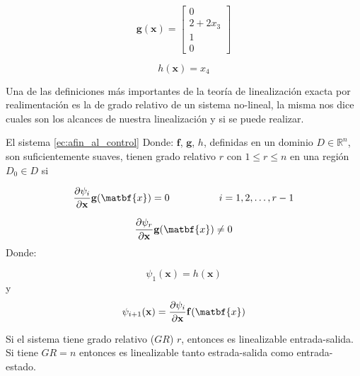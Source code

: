 \documentclass[10pt]{article}
\begin{document}
\begin{equation}
    \mathbf{g(\mathbf{x})}=
\begin{bmatrix}
 0\\
 2+ 2x_{3} \\
 1\\
 0
\end{bmatrix}
\label{ec:g}
\end{equation}

\begin{equation}
    h(\mathbf{x}) = x_{4}
\end{equation}

Una de las definiciones más importantes de la teoría de linealización exacta por
realimentación es la de grado relativo de un sistema no-lineal, la misma nos dice
cuales son los alcances de nuestra linealización y si se puede realizar.

\begin{defi}
    El sistema \eqref{ec:afin_al_control} Donde: $\mathbf{f}$, $\mathbf{g}$, $h$, definidas
    en un dominio $D\in \mathbb{R}^{n}$, son suficientemente suaves, tienen grado relativo $r$
    con $1\leq r \leq n$ en una región $D_{0}\in D$ si

\begin{equation}
    \frac{\partial \psi_{i}}{\partial \mathbf{x}}\mathbf{g}(\matbf{x}) = 0 \hspace{5em} i=1,2,\dots , r-1
\end{equation}

\begin{equation}
    \frac{\partial \psi_{r}}{\partial \mathbf{x}} \mathbf{g}(\matbf{x}) \neq 0  
\end{equation}
       Donde:

\begin{equation}
    \psi_{1}(\mathbf{x}) = h(\mathbf{x}) 
\end{equation}
y
\begin{equation}
     \psi_{i+1}(\mathbf{x}) = \frac{\partial \psi_{i}}{\partial \mathbf{x}}\mathbf{f}(\matbf{x}) 
\end{equation}

\end{defi}   


Si el sistema tiene grado relativo ($GR$) $r$, entonces es linealizable entrada-salida. Si
tiene $GR=n$ entonces es linealizable tanto estrada-salida como entrada-estado.
\end{document}
